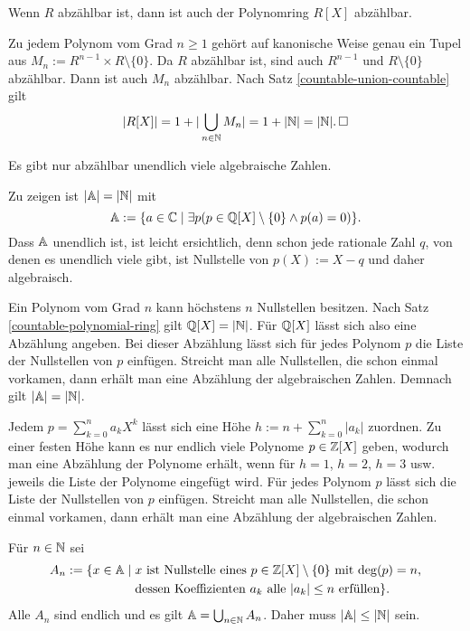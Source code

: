 \begin{Satz}\label{countable-polynomial-ring}
Wenn $R$ abzählbar ist, dann ist auch der Polynomring $R[X]$ abzählbar.
\end{Satz}

\begin{Beweis}
Zu jedem Polynom vom Grad $n\ge 1$ gehört auf kanonische Weise
genau ein Tupel aus $M_n:=R^{n-1}\times R\setminus\{0\}$. Da $R$
abzählbar ist, sind auch $R^{n-1}$ und $R\setminus\{0\}$ abzählbar.
Dann ist auch $M_n$ abzählbar. Nach Satz \ref{countable-union-countable}
gilt
\[|R[X]| = 1+|\bigcup_{n\in\mathbb N} M_n| = 1+|\mathbb N| = |\mathbb N|.\,\square\]
\end{Beweis}

\begin{Satz}
Es gibt nur abzählbar unendlich viele algebraische Zahlen.
\end{Satz}

\begin{Beweis}[Beweis 1]
Zu zeigen ist $|\mathbb A|=|\mathbb N|$ mit
\[\mathbb A := \{a\in\mathbb C\mid \exists p(p\in \mathbb Q[X]\setminus\{0\}\land p(a)=0)\}.\]
Dass $\mathbb A$ unendlich ist, ist leicht ersichtlich, denn schon jede
rationale Zahl $q$, von denen es unendlich viele gibt, ist Nullstelle
von $p(X):=X-q$ und daher algebraisch.

Ein Polynom vom Grad $n$ kann höchstens $n$ Nullstellen besitzen.
Nach Satz \ref{countable-polynomial-ring} gilt $\mathbb Q[X]=|\mathbb N|$.
Für $\mathbb Q[X]$ lässt sich also eine Abzählung angeben.
Bei dieser Abzählung lässt sich für jedes Polynom $p$ die Liste der
Nullstellen von $p$ einfügen. Streicht man alle Nullstellen, die schon
einmal vorkamen, dann erhält man eine Abzählung der algebraischen
Zahlen. Demnach gilt $|\mathbb A|=|\mathbb N|$.\,\qedsymbol
\end{Beweis}

\begin{Beweis}[Beweis 2]
Jedem $p=\sum_{k=0}^n a_kX^k$ lässt sich eine Höhe
$h:=n+\sum_{k=0}^n |a_k|$ zuordnen. Zu einer festen Höhe kann es nur
endlich viele Polynome $p\in\mathbb Z[X]$ geben, wodurch man eine Abzählung der
Polynome erhält, wenn für $h=1$, $h=2$, $h=3$ usw. jeweils die Liste
der Polynome eingefügt wird. Für jedes Polynom $p$ lässt sich die
Liste der Nullstellen von $p$ einfügen. Streicht man alle Nullstellen,
die schon einmal vorkamen, dann erhält man eine Abzählung der
algebraischen Zahlen.\,\qedsymbol
\end{Beweis}

\begin{Beweis}[Beweis 3]
Für $n\in\mathbb N$ sei
\[\begin{split}
A_n := \{x\in\mathbb A\mid \;&\text{$x$ ist Nullstelle eines
$p\in\mathbb Z[X]\setminus\{0\}$ mit $\deg(p)=n$,}\\
& \text{dessen Koeffizienten $a_k$ alle $|a_k|\le n$
erfüllen}\}.
\end{split}\]
Alle $A_n$ sind endlich und es gilt $\mathbb A=\bigcup_{n\in\mathbb N} A_n$.
Daher muss $|\mathbb A|\le |\mathbb N|$ sein.\,\qedsymbol
\end{Beweis}
